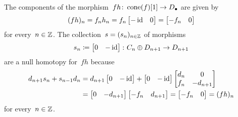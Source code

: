 \section{}





\subsection{}

The components of the morphism~$fh \colon \operatorname{cone}(f)[1] \to D_\bullet$ are given by
\[
    (fh)_n
  = f_n h_n
  = f_n
    \begin{bmatrix}
      -\operatorname{id}  & 0
    \end{bmatrix}
  = \begin{bmatrix}
      -f_n  & 0
    \end{bmatrix}
\]
for every~$n \in \mathbb{Z}$.
The collection~$s = (s_n)_{n \in \mathbb{Z}}$ of morphisms
\[
            s_n
  \coloneqq  \begin{bmatrix}
              0 & -\operatorname{id}
            \end{bmatrix}
  \colon    C_n \oplus D_{n+1}
  \to       D_{n+1}
\]
are a null homotopy for~$fh$ because
\begin{align*}
      d_{n+1} s_n + s_{n-1} d_n
  &=  d_{n+1}
      \begin{bmatrix}
        0 & -\operatorname{id}
      \end{bmatrix}
      +
      \begin{bmatrix}
        0 & -\operatorname{id}
      \end{bmatrix}
      \begin{bmatrix}
        d_n & 0         \\
        f_n & -d_{n+1}
      \end{bmatrix}
\\
  &=  \begin{bmatrix}
        0 & -d_{n+1}
      \end{bmatrix}
      \begin{bmatrix}
        -f_n  & d_{n+1}
      \end{bmatrix}
   =  \begin{bmatrix}
        -f_n  & 0
      \end{bmatrix}
   =  (fh)_n
\end{align*}
for every~$n \in \mathbb{Z}$.





\subsection{}

